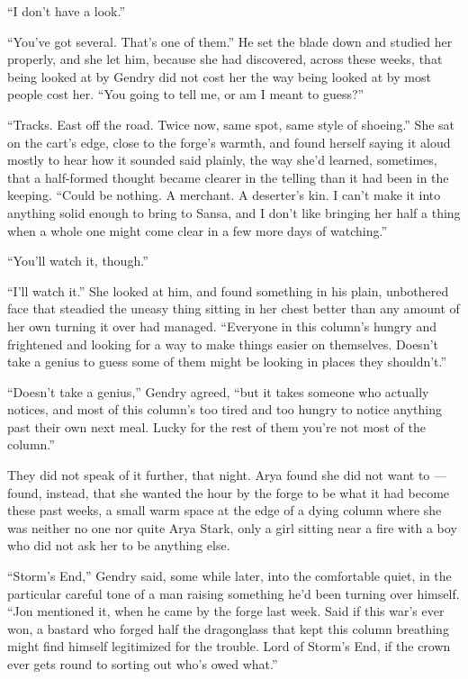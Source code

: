 “I don’t have a look.”

“You’ve got several. That’s one of them.” He set the blade down and studied her properly, and she let him, because she had discovered, across these weeks, that being looked at by Gendry did not cost her the way being looked at by most people cost her. “You going to tell me, or am I meant to guess?”

“Tracks. East off the road. Twice now, same spot, same style of shoeing.” She sat on the cart’s edge, close to the forge’s warmth, and found herself saying it aloud mostly to hear how it sounded said plainly, the way she’d learned, sometimes, that a half-formed thought became clearer in the telling than it had been in the keeping. “Could be nothing. A merchant. A deserter’s kin. I can’t make it into anything solid enough to bring to Sansa, and I don’t like bringing her half a thing when a whole one might come clear in a few more days of watching.”

“You’ll watch it, though.”

“I’ll watch it.” She looked at him, and found something in his plain, unbothered face that steadied the uneasy thing sitting in her chest better than any amount of her own turning it over had managed. “Everyone in this column’s hungry and frightened and looking for a way to make things easier on themselves. Doesn’t take a genius to guess some of them might be looking in places they shouldn’t.”

“Doesn’t take a genius,” Gendry agreed, “but it takes someone who actually notices, and most of this column’s too tired and too hungry to notice anything past their own next meal. Lucky for the rest of them you’re not most of the column.”

\sceneBreak

They did not speak of it further, that night. Arya found she did not want to — found, instead, that she wanted the hour by the forge to be what it had become these past weeks, a small warm space at the edge of a dying column where she was neither no one nor quite Arya Stark, only a girl sitting near a fire with a boy who did not ask her to be anything else.

“Storm’s End,” Gendry said, some while later, into the comfortable quiet, in the particular careful tone of a man raising something he’d been turning over himself. “Jon mentioned it, when he came by the forge last week. Said if this war’s ever won, a bastard who forged half the dragonglass that kept this column breathing might find himself legitimized for the trouble. Lord of Storm’s End, if the crown ever gets round to sorting out who’s owed what.”

